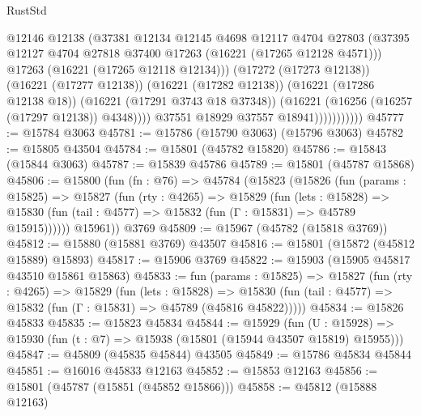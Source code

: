 \begin{lexlean}{RustStd}
\begin{coremodule}
                              @12146
                              @12138
                              (@37381
                                @12134
                                @12145
                                @4698
                                @12117
                                @4704
                                @27803
                                (@37395
                                  @12127
                                  @4704
                                  @27818
                                  @37400
                                  @17263
                                  (@16221 (@17265 @12128 @4571)))
                                @17263
                                (@16221 (@17265 @12118 @12134)))
                              (@17272 (@17273 @12138))
                              (@16221 (@17277 @12138))
                              (@16221 (@17282 @12138))
                              (@16221 (@17286 @12138 @18))
                              (@16221 (@17291 @3743 @18 @37348))
                              (@16221 (@16256 (@16257 (@17297 @12138)) @4348))))
                          @37551
                          @18929
                          @37557
                          @18941)))))))))))
@45777 := @15784 @3063
@45781 := @15786 (@15790 @3063) (@15796 @3063)
@45782 := @15805 @43504
@45784 := @15801 (@45782 @15820)
@45786 := @15843 (@15844 @3063)
@45787 := @15839 @45786
@45789 := @15801 (@45787 @15868)
@45806 := @15800
    (fun (fn : @76) =>
    @45784
      (@15823
        (@15826
          (fun (params : @15825) =>
          @15827
            (fun (rty : @4265) =>
            @15829
              (fun (lets : @15828) =>
              @15830 (fun (tail : @4577) => @15832 (fun (Γ : @15831) => @45789 @15915))))))
        @15961))
    @3769
@45809 := @15967 (@45782 (@15818 @3769))
@45812 := @15880 (@15881 @3769) @43507
@45816 := @15801 (@15872 (@45812 @15889) @15893)
@45817 := @15906 @3769
@45822 := @15903 (@15905 @45817 @43510 @15861 @15863)
@45833 := fun (params : @15825) =>
  @15827
    (fun (rty : @4265) =>
    @15829
      (fun (lets : @15828) =>
      @15830 (fun (tail : @4577) => @15832 (fun (Γ : @15831) => @45789 (@45816 @45822)))))
@45834 := @15826 @45833
@45835 := @15823 @45834
@45844 := @15929
    (fun (U : @15928) => @15930 (fun (t : @7) => @15938 (@15801 (@15944 @43507 @15819) @15955)))
@45847 := @45809 (@45835 @45844) @43505
@45849 := @15786 @45834 @45844
@45851 := @16016 @45833 @12163
@45852 := @15853 @12163
@45856 := @15801 (@45787 (@15851 (@45852 @15866)))
@45858 := @45812 (@15888 @12163)

\end{coremodule}
\end{lexlean}

